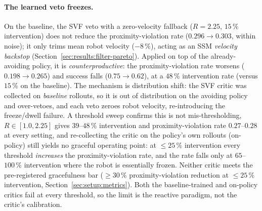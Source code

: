 \documentclass[11pt,a4paper]{report}
\newcommand{\ssm}{SSM}
\begin{document}
\paragraph{The learned veto freezes.}
On the baseline, the SVF veto with a zero-velocity fallback
($R = 2.25$, $15\,\%$ intervention) does not reduce the proximity-violation rate
($0.296 \rightarrow 0.303$, within noise); it only trims mean robot
velocity ($-8\,\%$), acting as an \ssm{} \emph{velocity backstop}
(Section~\ref{sec:results:filter-pareto}). Applied on top of the
already-avoiding policy, it is \emph{counterproductive}: the proximity-violation rate
worsens ($0.198 \rightarrow 0.265$) and success falls
($0.75 \rightarrow 0.62$), at a $48\,\%$ intervention rate (versus
$15\,\%$ on the baseline). The mechanism is distribution shift: the SVF
critic was collected on \emph{baseline} rollouts, so it is out of
distribution on the avoiding policy and over-vetoes, and each veto
zeroes robot velocity, re-introducing the freeze/dwell failure. A
threshold sweep confirms this is not mis-thresholding, $R \in [1.0,
2.25]$ gives $39$--$48\,\%$ intervention and proximity-violation rate $0.27$--$0.28$ at
every setting, and re-collecting the critic on the policy's own
rollouts (on-policy) still yields no graceful operating point: at
$\le 25\,\%$ intervention every threshold \emph{increases} the
proximity-violation rate, and the rate falls only at $65$--$100\,\%$
intervention where the robot
is essentially frozen. Neither critic meets the pre-registered
gracefulness bar ($\geq 30\,\%$ proximity-violation reduction at $\leq 25\,\%$
intervention, Section~\ref{sec:setup:metrics}). Both the
baseline-trained and on-policy critics fail at every threshold, so the
limit is the reactive paradigm, not the critic's calibration.
\end{document}
